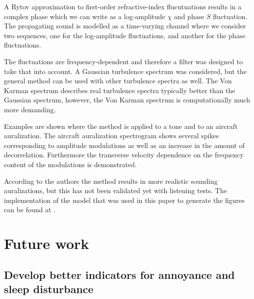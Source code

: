 A Rytov approximation to first-order refractive-index flucutuations results in a complex
phase which we can write as a log-amplitude $\chi$ and phase $S$ fluctuation.
The propagating sound is modelled as a time-varying channel where we consider
two sequences, one for the log-amplitude fluctuations, and another for the phase
fluctuations.

The fluctuations are frequency-dependent and therefore a filter was designed to take that into account.
A Gaussian turbulence spectrum was considered, but the general method can be
used with other turbulence spectra as well. The Von Karman spectrum describes
real turbulence spectra typically better than the Gaussian spectrum, however,
the Von Karman spectrum is computationally much more demanding.

Examples are shown where the method is applied to a tone and to an aircraft
auralization. The aircraft auralization spectrogram shows several spikes
corresponding to amplitude modulations as well as an increase in the amount of
decorrelation. Furthermore the transverse velocity dependence on the frequency
content of the modulations is demonstrated.

According to the authors the method results in more realistic sounding
auralizations, but this has not been validated yet with listening tests. The
implementation of the model that was used in this paper to generate the figures
can be found at \cite{Rietdijk2016}.



\section{Future work}


\subsection{Develop better indicators for annoyance and sleep disturbance}

